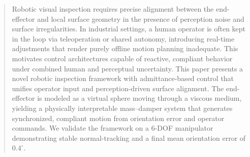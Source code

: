 \documentclass[journal]{IEEEtran}
\begin{document}


% 











\maketitle

\begin{abstract}
Robotic visual inspection requires precise alignment between the end-effector and local surface geometry in the presence of perception noise and surface irregularities. In industrial settings, a human operator is often kept in the loop via teleoperation or shared autonomy, introducing real-time adjustments that render purely offline motion planning inadequate. This motivates control architectures capable of reactive, compliant behavior under combined human and perceptual uncertainty. This paper presents a novel robotic inspection framework with admittance-based control that unifies operator input and perception-driven surface alignment. The end-effector is modeled as a virtual sphere moving through a viscous medium, yielding a physically interpretable mass–damper system that generates synchronized, compliant motion from orientation error and operator commands. We validate the framework on a 6-DOF manipulator demonstrating stable normal-tracking and a final mean orientation error of $0.4^\circ$.

\end{abstract}
\end{document}
